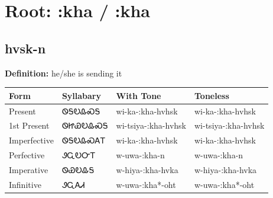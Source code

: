 \documentclass{article}%
\begin{document}
%
\normalsize%
\section*{Root: :kha / :kha}%
\subsection*{hvsk-n}%
\textbf{Definition: }%
he/she is sending it%
\\[0.5em]%
\begin{tabular}{|l|l|l|l|}%
\hline%
\textbf{Form}&\textbf{Syllabary}&\textbf{With Tone}&\textbf{Toneless}\\%
\hline%
Present&ᏫᎦᎧᎲᏍᎦ&wi{-}ka{-}:kha{-}hvhsk&wi{-}ka{-}:kha{-}hvhsk\\%
1st Present&ᏫᏥᏯᎧᎲᏍᎦ&wi{-}tsiya{-}:kha{-}hvhsk&wi{-}tsiya{-}:kha{-}hvhsk\\%
Imperfective&ᏫᎦᎧᎲᏍᎪᎢ&wi{-}ka{-}:kha{-}hvhsk&wi{-}ka{-}:kha{-}hvhsk\\%
Perfective&ᏭᏩᎧᏅᎢ&w{-}uwa{-}:kha{-}n&w{-}uwa{-}:kha{-}n\\%
Imperative&ᏫᏯᎧᎲᎦ&w{-}hiya{-}:kha{-}hvka&w{-}hiya{-}:kha{-}hvka\\%
Infinitive&ᏭᏩᎪᏗ&w{-}uwa{-}:kha*{-}oht&w{-}uwa{-}:kha*{-}oht\\%
\hline%
\end{tabular}%
\\[1em]%
\end{document}
